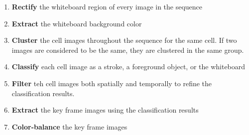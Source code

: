 \documentclass{article}
\begin{document}
\begin{enumerate} \itemsep -2pt
\item \textbf{Rectify} the whiteboard region of every image in the sequence
\item \textbf{Extract} the whiteboard background color
\item \textbf{Cluster} the cell images throughout the sequence for the same cell. If two images are considered to be the same, they are clustered in the same group.
\item \textbf{Classify} each cell image as a stroke, a foreground object, or the whiteboard
\item \textbf{Filter} teh cell images both spatially and temporally to refine the classification results.
\item \textbf{Extract} the key frame images using the classification results
\item \textbf{Color-balance} the key frame images
\end{enumerate}
\end{document}
